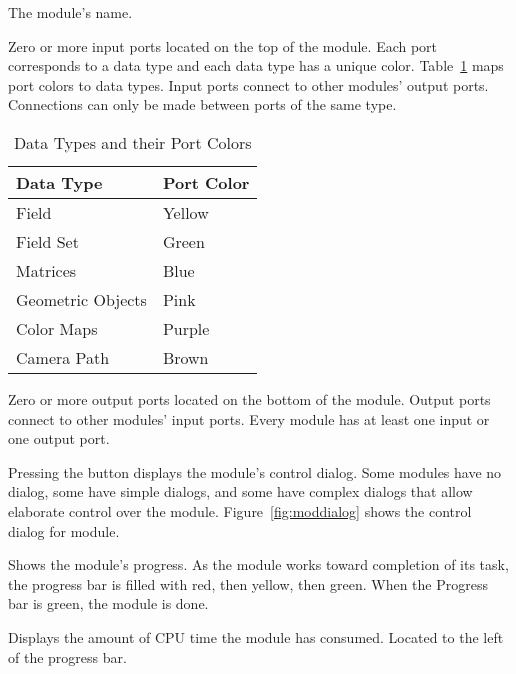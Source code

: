 \begin{description}
   The module's name.
  
   Zero or more input ports located on the top
  of the module.  Each port corresponds to a data type and each data
  type has a unique color.  Table~\ref{tab:portcolors} maps port
  colors to data types.  Input ports connect to other modules' output
  ports.  Connections can only be made between ports of the same type.

  \begin{table}[htbp]
    \begin{center}
      \begin{tabular}{|l|l|}
        \hline
        \textbf{Data Type} & \textbf{Port Color} \\
        \hline
        Field & Yellow \\
        Field Set & Green \\
        Matrices & Blue \\
        Geometric Objects & Pink \\
        Color Maps & Purple \\
        Camera Path & Brown \\
        \hline
      \end{tabular}
      \caption{Data Types and their Port Colors}
      \label{tab:portcolors}
    \end{center}
  \end{table}
  
   Zero or more output ports located on the
  bottom of the module.  Output ports connect to other modules' input
  ports.  Every module has  at least one input or one output
  port.
  
   Pressing the  button displays the
  module's control dialog. Some modules have no dialog, some have
  simple dialogs, and some have complex dialogs that allow
  elaborate control over the module.  Figure~\ref{fig:moddialog} shows
  the control dialog for  module.
  
   Shows the module's progress.  As the module
  works toward completion of its task, the progress bar is filled
  with red, then yellow, then green.  When the Progress bar
  is green, the module is done.
  
   Displays the amount of CPU time the module has
  consumed.  Located to the left of the progress bar.
  

\end{description}
